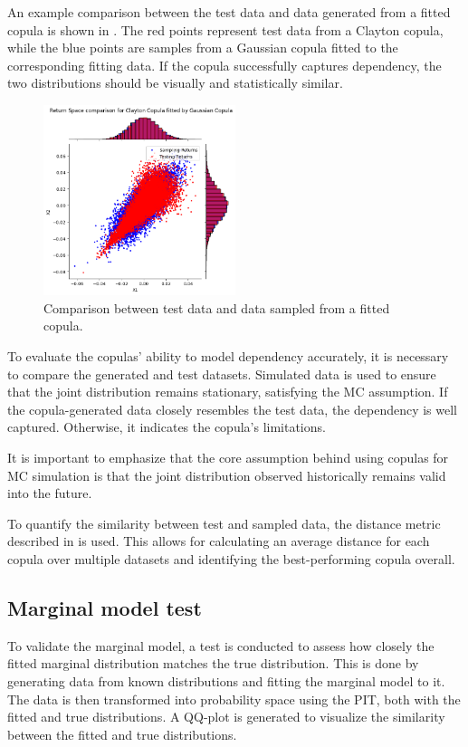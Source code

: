 An example comparison between the test data and data generated from a fitted copula is shown in . The red points represent test data from a Clayton copula, while the blue points are samples from a Gaussian copula fitted to the corresponding fitting data. If the copula successfully captures dependency, the two distributions should be visually and statistically similar.

\begin{figure}
\centering
\includegraphics[width=0.5\textwidth]{4Method/pictures/TestSampleComparison.png}
\caption{Comparison between test data and data sampled from a fitted copula.}
\label{fig:TestSampleComparison}
\end{figure}

To evaluate the copulas’ ability to model dependency accurately, it is necessary to compare the generated and test datasets. Simulated data is used to ensure that the joint distribution remains stationary, satisfying the \gls{MC} assumption. If the copula-generated data closely resembles the test data, the dependency is well captured. Otherwise, it indicates the copula’s limitations.

It is important to emphasize that the core assumption behind using copulas for \gls{MC} simulation is that the joint distribution observed historically remains valid into the future.

To quantify the similarity between test and sampled data, the distance metric described in  is used. This allows for calculating an average distance for each copula over multiple datasets and identifying the best-performing copula overall.

\subsection{Marginal model test}
To validate the marginal model, a test is conducted to assess how closely the fitted marginal distribution matches the true distribution. This is done by generating data from known distributions and fitting the marginal model to it. The data is then transformed into probability space using the \gls{PIT}, both with the fitted and true distributions. A QQ-plot is generated to visualize the similarity between the fitted and true distributions. 

